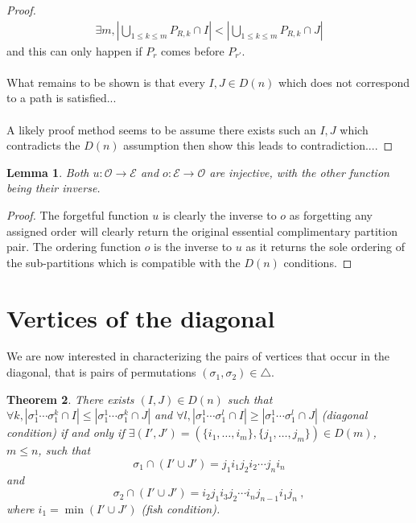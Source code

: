 \documentclass[11pt]{amsart}
\newtheorem{thm}{Theorem}[section]
\newtheorem{lemma}[thm]{Lemma}
\theoremstyle{definition}
\theoremstyle{remark}
\numberwithin{equation}{section}
\newcommand{\EC}{\mathcal{E}} %
\newcommand{\OP}{\mathcal{O}} %
\newcommand{\0}{\color{blue}{\mathsf{0}}}
\begin{document}
\begin{proof}
\begin{align*}
    \exists m, |\bigcup_{1\leq k \leq m} P_{R,k} \cap I| < |\bigcup_{1\leq k \leq m} P_{R,k} \cap J|
\end{align*}
and this can only happen if $P_r$ comes before $P_{r'}$.
\\\\
What remains to be shown is that every $I,J \in D(n)$ which does not correspond to a path is satisfied... 
\\\\
A likely proof method seems to be assume there exists such an $I,J$ which contradicts the $D(n)$ assumption then show this leads to contradiction....
\end{proof}

\begin{lemma} \label{o and u are injective}
Both $u:\OP \to \EC$ and $o:\EC\to \OP$ are injective, with the other function being their inverse.
\end{lemma}
\begin{proof}
The forgetful function $u$ is clearly the inverse to $o$ as forgetting any assigned order will clearly return the original essential complimentary partition pair. The ordering function $o$ is the inverse to $u$ as it returns the sole ordering of the sub-partitions which is compatible with the $D(n)$ conditions.
\end{proof}




\section{Vertices of the diagonal}

We are now interested in characterizing the pairs of vertices that occur in the diagonal, that is pairs of permutations $(\sigma_1,\sigma_2) \in \triangle$. 

\begin{thm} There exists $(I,J) \in D(n)$ such that $\forall k, |\sigma_1^1\cdots\sigma_1^k \cap I| \leq |\sigma_1^1\cdots\sigma_1^k \cap J|$ and $\forall l, |\sigma_1^1\cdots\sigma_1^l \cap I| \geq |\sigma_1^1\cdots\sigma_1^l \cap J|$ (diagonal condition) if and only if $\exists (I',J')=(\{i_1,\ldots,i_m\},\{j_1,\ldots,j_m\}) \in D(m)$, $m\leq n$, such that \[\sigma_1 \cap (I'\cup J')=j_1 i_1 j_2 i_2 \cdots j_n i_n \] and \[ \sigma_2 \cap (I'\cup J') = i_2 j_1 i_3 j_2 \cdots i_n j_{n-1} i_1 j_n \ , \] where $i_1 = \min (I' \cup J')$ (fish condition). 
\end{thm}
\end{document}
